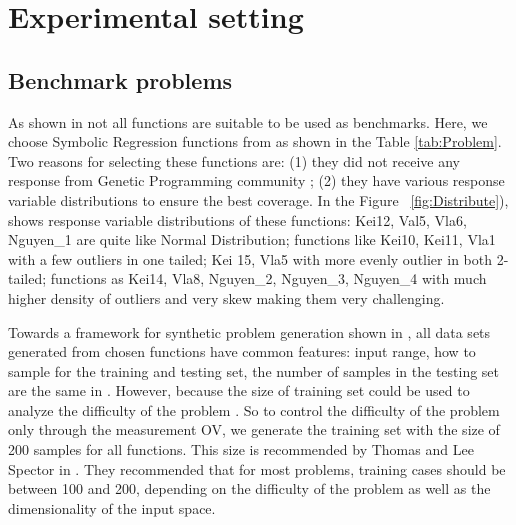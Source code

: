 \section{Experimental setting}
\label{Exp}
\subsection{Benchmark problems}
\label{Ben}
As shown in \cite{2015Mig} not all functions are suitable to be used as benchmarks. Here, we choose Symbolic Regression functions from \cite{2012James} as shown in the Table \ref{tab:Problem}. Two reasons for selecting these functions are: (1) they did not receive any response from Genetic Programming community \cite{David2013}; (2) they have various response variable distributions to ensure the best coverage. In the Figure ~\ref{fig:Distribute}), shows response variable distributions of these functions: Kei12, Val5, Vla6, Nguyen\_1 are quite like Normal Distribution; functions like Kei10, Kei11, Vla1 with a few outliers in one tailed; Kei 15, Vla5 with more evenly outlier in both 2-tailed; functions as Kei14, Vla8, Nguyen\_2, Nguyen\_3, Nguyen\_4 with much higher density of outliers and very skew making them very challenging. \par
Towards a framework for synthetic problem generation shown in \cite{2015Mig}, all data sets generated from chosen functions have common features: input range, how to sample for the training and testing set, the number of samples in the testing set are the same in \cite{2012James}. However, because the size of training set could be used to analyze the difficulty of the problem \cite{2015Mig}. So to control the difficulty of the problem only through the measurement OV, we generate the training set with the  size of 200 samples for all functions. This size is recommended by Thomas and Lee Spector in \cite{Thomas2015}. They recommended that for most problems, training cases should be between 100 and 200, depending on the difficulty of the problem as well as the dimensionality of the input space.
